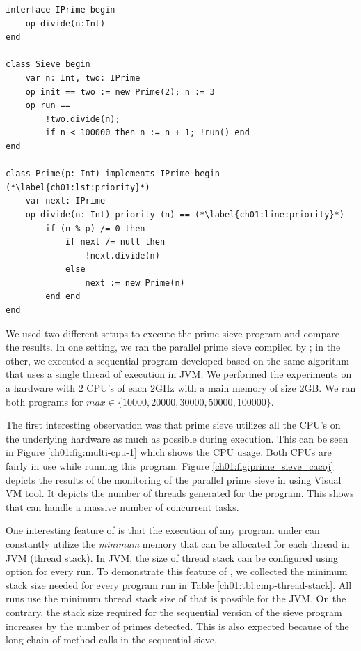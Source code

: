 \begin{lstlisting}[float=t, label=lst:prime-sieve-creol, caption=Prime Sieve in Creol]
interface IPrime begin
	op divide(n:Int)
end

class Sieve begin
	var n: Int, two: IPrime
	op init == two := new Prime(2); n := 3
	op run ==
		!two.divide(n);
		if n < 100000 then n := n + 1; !run() end
end

class Prime(p: Int) implements IPrime begin (*\label{ch01:lst:priority}*)
	var next: IPrime
	op divide(n: Int) priority (n) == (*\label{ch01:line:priority}*)
		if (n % p) /= 0 then 
			if next /= null then
				!next.divide(n)
			else
				next := new Prime(n)
		end end
end
\end{lstlisting}
% 

We used two different setups to execute the prime sieve program and compare the results. In one setting, we ran the parallel prime sieve compiled by \Crisp; in the other, we executed a sequential program developed based on the same algorithm that uses a single thread of execution in JVM. We performed the experiments on a hardware with $2$ CPU's of each $2$GHz with a main memory of size $2$GB. We ran both programs for $max \in \{10000, 20000, 30000, 50000, 100000\}$.

The first interesting observation was that \Crisp prime sieve utilizes all the CPU's on the underlying hardware as much as possible during  execution. 
This can be seen in Figure \ref{ch01:fig:multi-cpu-1} which shows the CPU usage. 
Both CPUs are fairly in use while running this program.
Figure \ref{ch01:fig:prime_sieve_cacoj} depicts the results of the monitoring of the parallel prime sieve in \Crisp using Visual VM tool. 
It depicts the number of threads generated for the program.
This shows that \Crisp can handle a massive number of concurrent tasks.


One interesting feature of \Crisp is that the execution of any program under \Crisp can constantly utilize the \emph{minimum} memory that can be allocated for each thread in JVM (thread stack). 
In JVM, the size of thread stack can be configured using  option for every run. 
To demonstrate this feature of \Crisp, we collected the minimum stack size needed for every program run in Table \ref{ch01:tbl:cmp-thread-stack}. 
All \Crisp runs use the minimum thread stack size of  that is possible for the JVM.
On the contrary, the stack size required for the sequential version of the sieve program increases by the number of primes detected. 
This is also expected because of the long chain of method calls in the sequential sieve.

